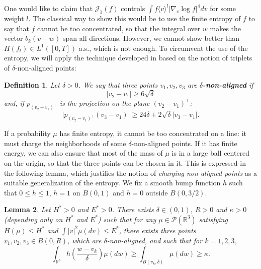 \documentclass[11pt,a4paper]{article}
\theoremstyle{definition}
\theoremstyle{plain}
\newtheorem{defi}{Definition}[section]
\newtheorem{lemma}[defi]{Lemma}
\newcommand{\jap}[1]{\langle #1 \rangle}
\begin{document}
One would like to claim that $\mathcal{J}_1(f)$ controls $\int f\jap{v}^l\vert \nabla_v\log f\vert^4 dv$ for some weight $l$. The classical way to show this would be to use the finite entropy of $f$ to say that $f$ cannot be too concentrated, so that the integral over $w$ makes the vector $b_k(v-w)$ span all directions. However, we cannot show better than $H(f_t)\in L^1([0,T])$ a.s., which is not enough. To circumvent the use of the entropy, we will apply the technique developed in \cite{FournierHauray2015} based on the notion of triplets of $\delta$-non-aligned points:
\begin{defi}\cite[Definition 6.1]{FournierHauray2015}
\label{def:deltanonaligned}
    Let $\delta>0$. We say that three points $v_1,v_2,v_3$ are \textbf{$\delta$-non-aligned} if
    \begin{equation}
        \label{eq:defdeltana1}
        \vert v_2-v_1\vert \geq 6\sqrt{\delta}
    \end{equation}
    and, if $p_{(v_2-v_1)^\perp}$ is the projection on the plane $(v_2-v_1)^\perp$:
    \begin{equation}
        \label{eq:defdeltana2}
        \vert p_{(v_2-v_1)^\perp}( v_3-v_1 )\vert  \geq 24\delta + 2\sqrt{\delta}\vert v_3-v_1\vert.
    \end{equation}
\end{defi}
If a probability $\mu$ has finite entropy, it cannot be too concentrated on a line: it must charge the neighborhoods of some $\delta$-non-aligned points. If it has finite energy, we can also ensure that most of the mass of $\mu$ is in a large ball centered on the origin, so that the three points can be chosen in it. This is expressed in the following lemma, which justifies the notion of \textit{charging non aligned points} as a suitable generalization of the entropy.
We fix a smooth bump function $h$ such that $0\leq h \leq 1$, $h=1$ on $B(0,1)$ and $h=0$ outside $B(0,3/2)$.
\begin{lemma}\cite[Lemma 6.3]{FournierHauray2015}
    \label{lem:entropyimpliesnonaligned}
    Let $H^*>0$ and $E^*>0$. There exists $\delta\in(0,1)$, $R>0$ and $\kappa>0$ (depending only on $H^*$ and $E^*$) such that for any $\mu\in\mathcal{P}(\mathbb{R}^3)$ satisfying $H(\mu)\leq H^*$ and $\int\vert v \vert^2 \mu(dv) \leq E^*$, there exists three points $v_1,v_2,v_3\in B(0,R)$, which are $\delta$-non-aligned, and such that for $k=1,2,3$,
    \begin{equation}
    \label{eq:entropyimpliesnonaligned}
            \int_{\mathbb{R}^3}h\left(\frac{w-v_k}{\delta}\right)\mu(dw) \geq \int_{B(v_k,\delta)}\mu(dw) \geq \kappa.
    \end{equation}
\end{lemma}
\end{document}
